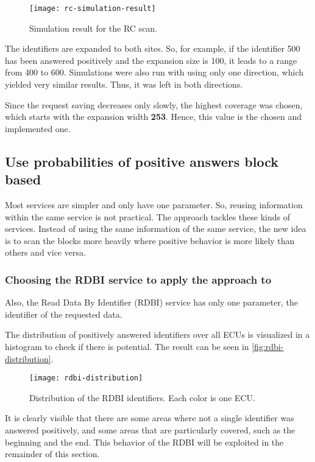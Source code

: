\begin{figure}[h]
    \centering
    \texttt{[image: rc-simulation-result]}
    \caption{Simulation result for the RC scan.}
    \label{fig:rc-simulation-result}
\end{figure}

The identifiers are expanded to both sites. So, for example, if the identifier 500 has been answered positively and the expansion size is 100, it leads to a range from 400 to 600. Simulations were also run with using only one direction, which yielded very similar results. Thus, it was left in both directions.

Since the request saving decreases only slowly, the highest coverage was chosen, which starts with the expansion width \textbf{253}. Hence, this value is the chosen and implemented one.


\subsection{Use probabilities of positive answers block based}

Most services are simpler and only have one parameter. So, reusing information within the same service is not practical. The approach tackles these kinds of services. Instead of using the same information of the same service, the new idea is to scan the blocks more heavily where positive behavior is more likely than others and vice versa.

\subsubsection{Choosing the RDBI service to apply the approach to}

Also, the Read Data By Identifier (RDBI) service has only one parameter, the identifier of the requested data.

The distribution of positively answered identifiers over all ECUs is visualized in a histogram to check if there is potential. The result can be seen in \autoref{fig:rdbi-distribution}.

\begin{figure}[h]
    \centering
    \texttt{[image: rdbi-distribution]}
    \caption{Distribution of the RDBI identifiers. Each color is one ECU.}
    \label{fig:rdbi-distribution}
\end{figure}

It is clearly visible that there are some areas where not a single identifier was answered positively, and some areas that are particularly covered, such as the beginning and the end. This behavior of the RDBI will be exploited in the remainder of this section.

